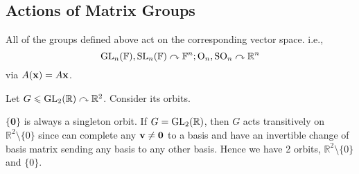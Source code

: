 \documentclass[10pt]{article}
\def\le{\leqslant}
\begin{document}
    \subsection{Actions of Matrix Groups}
    All of the groups defined above act on the corresponding vector space. i.e., 
    \[
        \mathrm{GL}_n({\mathbb{F}}),\mathrm{SL}_n({\mathbb{F}}) \curvearrowright {\mathbb{F}}^n; \mathrm{O}_n,\mathrm{SO}_n \curvearrowright {\mathbb{R}}^n
    \]
    via $ A({\bf x})=A{\bf x} $.

    \begin{example}
        Let $ G\le \GL_2(\bbR)\curvearrowright \bbR^2 $. Consider its orbits.

        $ \{\mathbf{0}\} $ is always a singleton orbit. If $ G=\mathrm{GL}_2({\mathbb{R}}) $, then $G$ acts transitively on $ \mathbb{R}^{2}\setminus\{0\} $ since can complete any $ {\bf v}\neq \mathbf{0} $ to a basis and have an invertible change of basis matrix sending any basis to any other basis. Hence we have 2 orbits, $ \mathbb{R}^{2}\setminus\{0\} $ and $ \{0\} $.
    \end{example}
\end{document}
